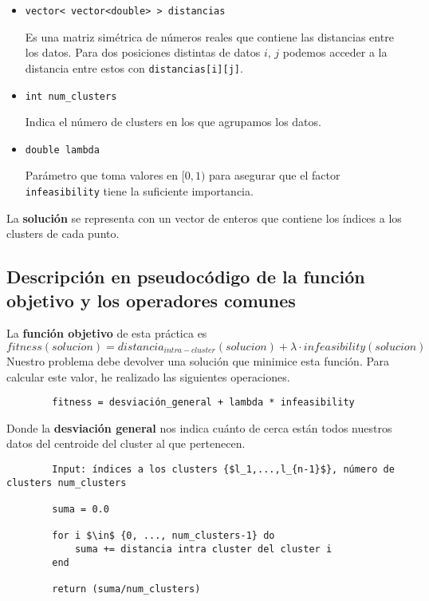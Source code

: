 \begin{itemize}
			\item \lstinline!vector< vector<double> > distancias!
			
				Es una matriz simétrica de números reales que contiene las distancias entre los datos. Para dos posiciones distintas de datos $i$, $j$ podemos acceder a la distancia entre estos con \lstinline!distancias[i][j]!.
			
			\item \lstinline!int num_clusters!
			
				Indica el número de clusters en los que agrupamos los datos.
			\item \lstinline!double lambda!

				Parámetro que toma valores en [$0,1)$ para asegurar que el factor \lstinline!infeasibility! tiene la suficiente importancia.
		
		\end{itemize}

		La \textbf{solución} se representa con un vector de enteros que contiene los índices a los clusters de cada punto.

	\subsection{Descripción en pseudocódigo de la función objetivo y los operadores comunes}

		La \textbf{función objetivo} de esta práctica es 
		$$fitness (solucion) = distancia_{intra-cluster} (solucion) + \lambda \cdot infeasibility (solucion)$$
		Nuestro problema debe devolver una solución que minimice esta función.
		Para calcular este valor, he realizado las siguientes operaciones.

		\footnotesize
		\begin{lstlisting}
		fitness = desviación_general + lambda * infeasibility
		\end{lstlisting}
		\normalsize

		Donde la \textbf{desviación general} nos indica cuánto de cerca están todos nuestros datos del centroide del cluster al que pertenecen.

		\footnotesize
		\begin{lstlisting}
		Input: índices a los clusters {$l_1,...,l_{n-1}$}, número de clusters num_clusters

		suma = 0.0

		for i $\in$ {0, ..., num_clusters-1} do
			suma += distancia intra cluster del cluster i
		end

		return (suma/num_clusters)
		\end{lstlisting}
		\normalsize

